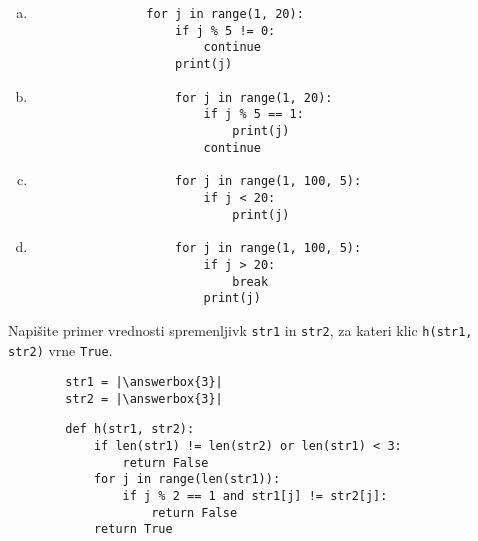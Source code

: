 \documentclass[arhiv, 10pt]{../izpit}
\newcommand{\inlinepy}[1]{\texttt{#1}}
\newcommand{\answerbox}[1]{\framebox{\vphantom{\large M}\hspace{#1cm}}}
\begin{document}
        \begin{multicols}{2}
        \begin{enumerate}[(a)]
\item 
            \begin{verbatim}
                for j in range(1, 20):
                    if j % 5 != 0:
                        continue
                    print(j)
            \end{verbatim}
        
\item 
                \begin{verbatim}
                    for j in range(1, 20):
                        if j % 5 == 1:
                            print(j)
                        continue
                \end{verbatim}
            
\item 
                \begin{verbatim}
                    for j in range(1, 100, 5):
                        if j < 20:
                            print(j)
                \end{verbatim}
            
\item 
                \begin{verbatim}
                    for j in range(1, 100, 5):
                        if j > 20:
                            break
                        print(j)
                \end{verbatim}
            
\end{enumerate}

        \end{multicols}
    
        \naloga*
        \begin{multicols}{2}
        \noindent
        Napišite primer vrednosti spremenljivk \inlinepy{str1} in \inlinepy{str2}, za kateri klic \inlinepy{h(str1, str2)} vrne \inlinepy{True}.
        \begin{verbatim}
        str1 = |\answerbox{3}|
        str2 = |\answerbox{3}|
        \end{verbatim}
        \vfil
        \columnbreak
        \begin{verbatim}
        def h(str1, str2):
            if len(str1) != len(str2) or len(str1) < 3:
                return False
            for j in range(len(str1)):
                if j % 2 == 1 and str1[j] != str2[j]:
                    return False
            return True
        \end{verbatim}
        \end{multicols}
    
\end{document}
